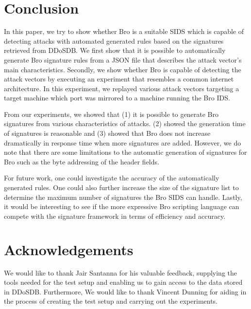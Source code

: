 \section{Conclusion}
\label{section:conclusion}
In this paper, we try to show whether Bro is a suitable SIDS which is capable of detecting attacks with automated generated rules based on the signatures retrieved from DDoSDB. We first show that it is possible to automatically generate Bro signature rules from a JSON file that describes the attack vector's main characteristics. Secondly, we show whether Bro is capable of detecting the attack vectors by executing an experiment that resembles a common internet architecture. In this experiment, we replayed various attack vectors targeting a target machine which port was mirrored to a machine running the Bro IDS. 

From our experiments, we showed that (1) it is possible to generate Bro signatures from various characteristics of attacks. (2) showed the generation time of signatures is reasonable and (3) showed that Bro does not increase dramatically in response time when more signatures are added. However, we do note that there are some limitations to the automatic generation of signatures for Bro such as the byte addressing of the header fields.

For future work, one could investigate the accuracy of the automatically generated rules. One could also further increase the size of the signature list to determine the maximum number of signatures the Bro SIDS can handle. Lastly, it would be interesting to see if the more expressive Bro scripting language can compete with the signature framework in terms of efficiency and accuracy. 

\section{Acknowledgements}
We would like to thank Jair Santanna for his valuable feedback, supplying the tools needed for the test setup and enabling us to gain access to the data stored in DDoSDB. Furthermore, We would like to thank Vincent Dunning for aiding in the process of creating the test setup and carrying out the experiments.  